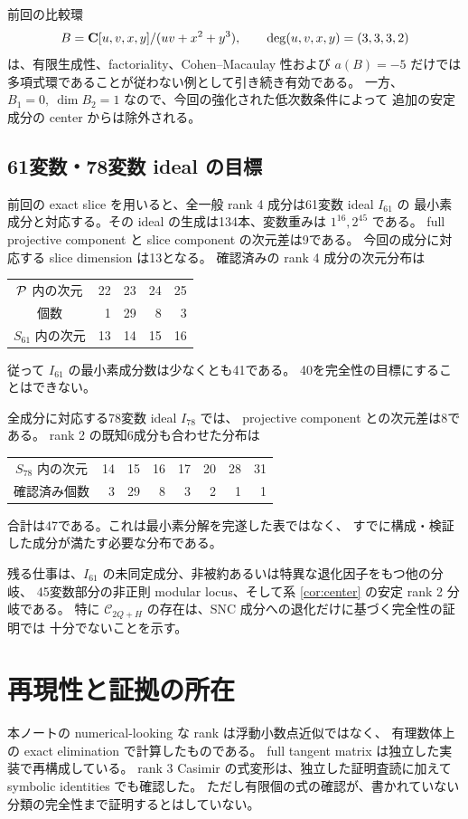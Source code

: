 \documentclass[11pt,a4paper]{ltjsarticle}
\theoremstyle{remark}\newtheorem{remark}[theorem]{注意}\renewcommand{\proofname}{証明}
\begin{document}
前回の比較環
\[
 B=\mathbf C[u,v,x,y]/(uv+x^2+y^3),\qquad
 \deg(u,v,x,y)=(3,3,3,2)
\]
は、有限生成性、factoriality、Cohen--Macaulay 性および $a(B)=-5$ だけでは
多項式環であることが従わない例として引き続き有効である。
一方、$B_1=0,\ \dim B_2=1$ なので、今回の強化された低次数条件によって
追加の安定成分の center からは除外される。

\subsection{61変数・78変数 ideal の目標}
前回の exact slice を用いると、全一般 rank 4 成分は61変数 ideal $I_{61}$ の
最小素成分と対応する。その ideal の生成は134本、変数重みは $1^{16},2^{45}$ である。
full projective component と slice component の次元差は9である。
今回の成分に対応する slice dimension は13となる。
確認済みの rank 4 成分の次元分布は
\begin{center}
\begin{tabular}{crrrr}
\toprule
$\mathcal P$ 内の次元&22&23&24&25\\
個数&1&29&8&3\\
$S_{61}$ 内の次元&13&14&15&16\\
\bottomrule
\end{tabular}
\end{center}
従って $I_{61}$ の最小素成分数は少なくとも41である。
40を完全性の目標にすることはできない。

全成分に対応する78変数 ideal $I_{78}$ では、
projective component との次元差は8である。
rank 2 の既知6成分も合わせた分布は
\begin{center}
\begin{tabular}{crrrrrrr}
\toprule
$S_{78}$ 内の次元&14&15&16&17&20&28&31\\
確認済み個数&3&29&8&3&2&1&1\\
\bottomrule
\end{tabular}
\end{center}
合計は47である。これは最小素分解を完遂した表ではなく、
すでに構成・検証した成分が満たす必要な分布である。

残る仕事は、$I_{61}$ の未同定成分、非被約あるいは特異な退化因子をもつ他の分岐、
45変数部分の非正則 modular locus、そして系 \ref{cor:center} の安定 rank 2 分岐である。
特に $\mathcal C_{2Q+H}$ の存在は、SNC 成分への退化だけに基づく完全性の証明では
十分でないことを示す。

\section{再現性と証拠の所在}
本ノートの numerical-looking な rank は浮動小数点近似ではなく、
有理数体上の exact elimination で計算したものである。
full tangent matrix は独立した実装で再構成している。
rank 3 Casimir の式変形は、独立した証明査読に加えて symbolic identities でも確認した。
ただし有限個の式の確認が、書かれていない分類の完全性まで証明するとはしていない。
\end{document}
